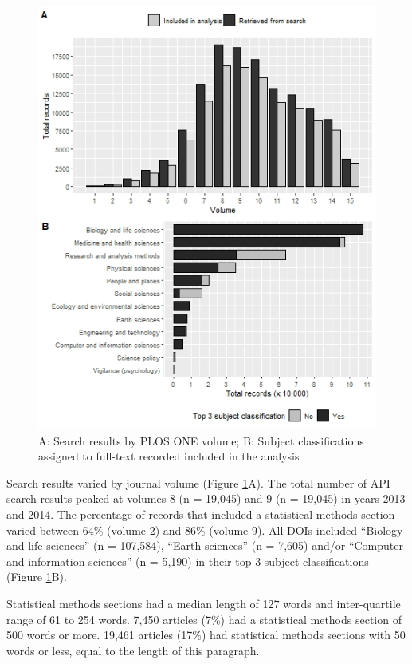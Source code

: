 \documentclass[12pt]{article}
\begin{document}
\begin{figure}[htbp]

{\centering \includegraphics[width=0.6\linewidth]{figures/plos_summary} 

}

\caption{\label{fig:plos-n} A: Search results by PLOS ONE volume; B: Subject classifications assigned to full-text recorded included in the analysis}
\end{figure}

Search results varied by journal volume (Figure \ref{fig:plos-n}A). The
total number of API search results peaked at volumes 8 (n = 19,045) and
9 (n = 19,045) in years 2013 and 2014.  The
percentage of records that included a statistical methods section varied between 64\%
(volume 2) and 86\% (volume 9). All DOIs included ``Biology and life
sciences'' (n = 107,584), ``Earth sciences'' (n = 7,605) and/or ``Computer and
information sciences'' (n = 5,190) in their top 3 subject classifications
(Figure \ref{fig:plos-n}B).

Statistical methods sections had a median length of 127 words and
inter-quartile range of 61 to 254 words. 7,450 articles (7\%) had a
statistical methods section of 500 words or more. 19,461 articles (17\%)
had statistical methods sections with 50 words or less, equal to the
length of this paragraph.

\end{document}
